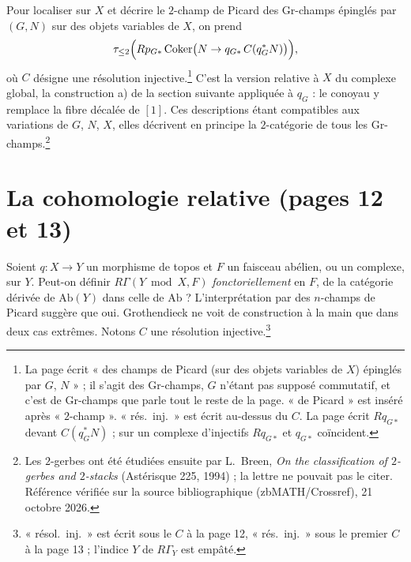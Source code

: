 \documentclass[11pt,a4paper]{article}
\begin{document}
Pour localiser sur $X$ et décrire le $2$-champ de Picard des Gr-champs
épinglés par $(G, N)$ sur des objets variables de $X$, on prend
\[ \tau_{\leq 2}\Bigl( R p_{G*}\, \mathrm{Coker}\bigl(N \to q_{G*}\,
   C(q_G^{*} N)\bigr) \Bigr) , \]
où $C$ désigne une résolution injective.\footnote{La page écrit « des champs
de Picard (sur des objets variables de $X$) épinglés par $G$, $N$ » ; il
s'agit des Gr-champs, $G$ n'étant pas supposé commutatif, et c'est de
Gr-champs que parle tout le reste de la page. « de Picard » est inséré après
« $2$-champ ». « rés.\ inj.\ » est écrit au-dessus du $C$. La page écrit
$R q_{G*}$ devant $C(q_G^*N)$ ; sur un complexe d'injectifs $R q_{G*}$ et
$q_{G*}$ coïncident.} C'est la version relative à $X$ du complexe global, la
construction a) de la section suivante appliquée à $q_G$ : le conoyau y
remplace la fibre décalée de $[1]$. Ces descriptions étant compatibles aux
variations de $G$, $N$, $X$, elles décrivent en principe la $2$-catégorie de
tous les Gr-champs.\footnote{Les $2$-gerbes ont été étudiées ensuite par
L.~Breen, \emph{On the classification of $2$-gerbes and $2$-stacks}
(Astérisque 225, 1994) ; la lettre ne pouvait pas le citer. Référence vérifiée sur la source bibliographique (zbMATH/Crossref), 21 octobre 2026.}

\section*{La cohomologie relative (pages 12 et 13)}

Soient $q : X \to Y$ un morphisme de topos et $F$ un faisceau abélien, ou un
complexe, sur $Y$. Peut-on définir $R\Gamma(Y \bmod X, F)$
\emph{fonctoriellement} en $F$, de la catégorie dérivée de $\mathrm{Ab}(Y)$
dans celle de $\mathrm{Ab}$ ? L'interprétation par des $n$-champs de Picard
suggère que oui. Grothendieck ne voit de construction à la main que dans deux
cas extrêmes. Notons $C$ une résolution injective.\footnote{« résol.\ inj.\ »
est écrit sous le $C$ à la page 12, « rés.\ inj.\ » sous le premier $C$ à la
page 13 ; l'indice $Y$ de $R\Gamma_Y$ est empâté.}
\end{document}
